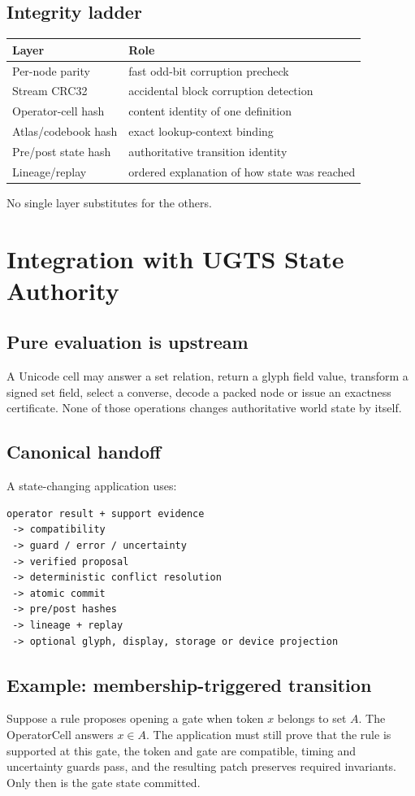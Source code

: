 \documentclass[11pt,a4paper]{article}
\begin{document}
\subsection{Integrity ladder}
\begin{tabularx}{\textwidth}{P{38mm}Y}
\toprule
\textbf{Layer} & \textbf{Role}\\
\midrule
Per-node parity & fast odd-bit corruption precheck\\
Stream CRC32 & accidental block corruption detection\\
Operator-cell hash & content identity of one definition\\
Atlas/codebook hash & exact lookup-context binding\\
Pre/post state hash & authoritative transition identity\\
Lineage/replay & ordered explanation of how state was reached\\
\bottomrule
\end{tabularx}
No single layer substitutes for the others.

\section{Integration with UGTS State Authority}
\subsection{Pure evaluation is upstream}
A Unicode cell may answer a set relation, return a glyph field value, transform a signed set field, select a converse, decode a packed node or issue an exactness certificate. None of those operations changes authoritative world state by itself.

\subsection{Canonical handoff}
A state-changing application uses:
\begin{Verbatim}[fontsize=\small,frame=single]
operator result + support evidence
 -> compatibility
 -> guard / error / uncertainty
 -> verified proposal
 -> deterministic conflict resolution
 -> atomic commit
 -> pre/post hashes
 -> lineage + replay
 -> optional glyph, display, storage or device projection
\end{Verbatim}

\subsection{Example: membership-triggered transition}
Suppose a rule proposes opening a gate when token \(x\) belongs to set \(A\). The OperatorCell answers \(x\in A\). The application must still prove that the rule is supported at this gate, the token and gate are compatible, timing and uncertainty guards pass, and the resulting patch preserves required invariants. Only then is the gate state committed.
\end{document}
